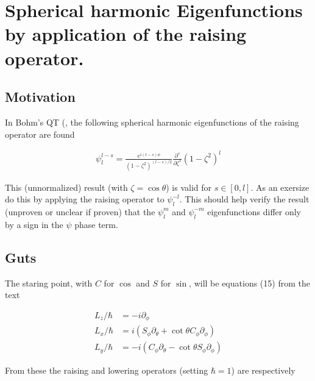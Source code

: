 

\chapter{Spherical harmonic Eigenfunctions by application of the raising operator.}
\label{chap:sphericalHarmonicRaising}
{}
\date{Aug 18, 2009}

\beginArtNoToc

\section{Motivation}

In Bohm's QT (\cite{bohm1989qt}, the following spherical harmonic eigenfunctions of the raising operator are found

\begin{align}\label{eqn:foo0}
\psi_l^{l-s} = \frac{e^{i(l-s)\phi}}{(1-\zeta^2)^{(l-s)/2}} \frac{\partial^s}{\partial \zeta^s} (1-\zeta^2)^l
\end{align}

This (unnormalized) result (with $\zeta = \cos\theta$) is valid for $s \in [0,l]$.  As an exersize do this by applying the raising operator to $\psi_l^{-l}$.  This should help verify the result (unproven or unclear if proven) that the $\psi_l^m$ and $\psi_l^{-m}$ eigenfunctions differ only by a sign in the $\psi$ phase term.

\section{Guts}

The staring point, with $C$ for $\cos$ and $S$ for $\sin$, will be equations (15) from the text

\begin{align*}
L_z/\hbar &= -i \partial_\phi \\
L_x/\hbar &= i (S_\phi \partial_\theta + \cot\theta C_\phi \partial_\phi) \\
L_y/\hbar &= -i (C_\phi \partial_\theta - \cot\theta S_\phi \partial_\phi)
\end{align*}

From these the raising and lowering operators (setting $\hbar=1$) are respectively

